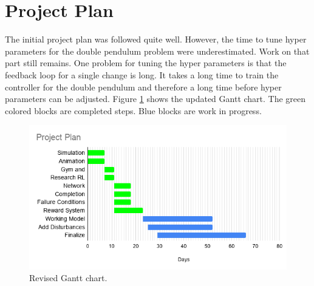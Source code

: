 \documentclass{LTHtwocol} %
\begin{document}
\section{Project Plan}
The initial project plan was followed quite well.
However, the time to tune hyper parameters for the double pendulum problem were underestimated.
Work on that part still remains.
One problem for tuning the hyper parameters is that the feedback loop for a single change is long.
It takes a long time to train the controller for the double pendulum and therefore a long time before hyper parameters can be adjusted.
Figure \ref{fig:gantt_chart} shows the updated Gantt chart.
The green colored blocks are completed steps.
Blue blocks are work in progress.
\begin{figure}[H]
   \centering
   \includegraphics[width=0.9\columnwidth]{figures/Revised_Project_plan.png}
   \caption{Revised Gantt chart.}
   \label{fig:gantt_chart}
\end{figure}
\printbibliography
\end{document}
